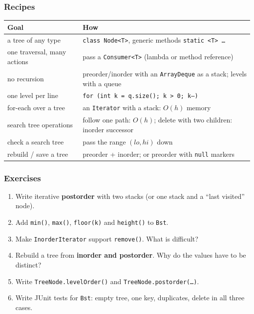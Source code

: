 \documentclass[aspectratio=169,10pt,compress]{beamer}
\begin{document}




\begin{frame}[t,fragile] \frametitle{Recipes}
  \begin{center}\footnotesize
  \begin{tabular}{ll}
    \toprule
    \textbf{Goal} & \textbf{How} \\
    \midrule
    a tree of any type             & \texttt{class Node<T>}, generic methods \texttt{static <T> \dots} \\
    one traversal, many actions    & pass a \texttt{Consumer<T>} (lambda or method reference) \\
    no recursion                   & preorder/inorder with an \texttt{ArrayDeque} as a stack; levels with a queue \\
    one level per line             & \texttt{for (int k = q.size(); k > 0; k--)} \\
    for-each over a tree           & an \texttt{Iterator} with a stack: $O(h)$ memory \\
    search tree operations         & follow one path: $O(h)$; delete with two children: inorder successor \\
    check a search tree            & pass the range $(lo, hi)$ down \\
    rebuild / save a tree          & preorder + inorder; or preorder with \texttt{null} markers \\
    \bottomrule
  \end{tabular}
  \end{center}
\end{frame}




\begin{frame}[t,fragile] \frametitle{Exercises}
  \begin{enumerate}\small
    \item Write iterative \textbf{postorder} with two stacks (or one stack and a ``last visited'' node).
    \item Add \texttt{min()}, \texttt{max()}, \texttt{floor(k)} and \texttt{height()} to \texttt{Bst}.
    \item Make \texttt{InorderIterator} support \texttt{remove()}. What is difficult?
    \item Rebuild a tree from \textbf{inorder and postorder}. Why do the values have to be distinct?
    \item Write \texttt{TreeNode.levelOrder()} and \texttt{TreeNode.postorder(\dots)}.
    \item Write JUnit tests for \texttt{Bst}: empty tree, one key, duplicates, delete in all three cases.
  \end{enumerate}
\end{frame}




\begin{frame}[t,fragile]
	\begin{center}
		\vspace{4cm}
	\end{center}
\end{frame}
\end{document}
